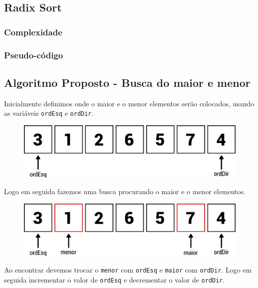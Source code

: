 \subsection{Radix Sort}

\subsubsection{Complexidade}

\subsubsection{Pseudo-código}

\newpage

\subsection{Algoritmo Proposto - Busca do maior e menor}

Inicialmente definimos onde o maior e o menor elementos serão colocados,
usando as variáveis \texttt{ordEsq} e \texttt{ordDir}.

\begin{figure}[h]
   \includegraphics[scale=0.6]{img/maior.menor.algoritmo/passo1.png}
\end{figure}

Logo em seguida fazemos uma busca procurando o maior e o menor
elementos.

\begin{figure}[h]
   \includegraphics[scale=0.6]{img/maior.menor.algoritmo/passo2.png}
\end{figure}

Ao encontrar devemos trocar o \texttt{menor} com \texttt{ordEsq} e
\texttt{maior} com \texttt{ordDir}. Logo em seguida incrementar o valor
de \texttt{ordEsq} e decrementar o valor de \texttt{ordDir}.

